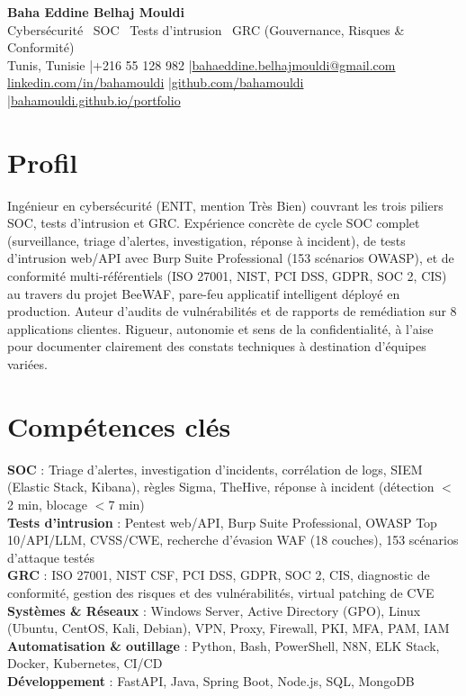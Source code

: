 \documentclass[a4paper,9pt]{article}
\begin{document}
\begin{center}
{\LARGE\bfseries\color{navy} Baha Eddine Belhaj Mouldi}\\[2pt]
{\normalsize\color{navy} Cybersécurité \textbar\ SOC \textbar\ Tests d'intrusion \textbar\ GRC (Gouvernance, Risques \& Conformité)}\\[3pt]
{\small Tunis, Tunisie \quad|\quad +216 55 128 982 \quad|\quad \href{mailto:bahaeddine.belhajmouldi@gmail.com}{bahaeddine.belhajmouldi@gmail.com}}\\[1pt]
{\small \href{https://www.linkedin.com/in/bahamouldi}{linkedin.com/in/bahamouldi} \quad|\quad \href{https://github.com/bahamouldi}{github.com/bahamouldi} \quad|\quad \href{https://bahamouldi.github.io/portfolio/}{bahamouldi.github.io/portfolio}}
\end{center}
\vspace{1pt}
\section{Profil}
Ingénieur en cybersécurité (ENIT, mention Très Bien) couvrant les trois piliers SOC, tests d'intrusion et GRC. Expérience concrète de cycle SOC complet (surveillance, triage d'alertes, investigation, réponse à incident), de tests d'intrusion web/API avec Burp Suite Professional (153 scénarios OWASP), et de conformité multi-référentiels (ISO 27001, NIST, PCI DSS, GDPR, SOC 2, CIS) au travers du projet BeeWAF, pare-feu applicatif intelligent déployé en production. Auteur d'audits de vulnérabilités et de rapports de remédiation sur 8 applications clientes. Rigueur, autonomie et sens de la confidentialité, à l'aise pour documenter clairement des constats techniques à destination d'équipes variées.
\section{Compétences clés}
\textbf{SOC} : Triage d'alertes, investigation d'incidents, corrélation de logs, SIEM (Elastic Stack, Kibana), règles Sigma, TheHive, réponse à incident (détection $<$2 min, blocage $<$7 min)\\[0.3pt]
\textbf{Tests d'intrusion} : Pentest web/API, Burp Suite Professional, OWASP Top 10/API/LLM, CVSS/CWE, recherche d'évasion WAF (18 couches), 153 scénarios d'attaque testés\\[0.3pt]
\textbf{GRC} : ISO 27001, NIST CSF, PCI DSS, GDPR, SOC 2, CIS, diagnostic de conformité, gestion des risques et des vulnérabilités, virtual patching de CVE\\[0.3pt]
\textbf{Systèmes \& Réseaux} : Windows Server, Active Directory (GPO), Linux (Ubuntu, CentOS, Kali, Debian), VPN, Proxy, Firewall, PKI, MFA, PAM, IAM\\[0.3pt]
\textbf{Automatisation \& outillage} : Python, Bash, PowerShell, N8N, ELK Stack, Docker, Kubernetes, CI/CD\\[0.3pt]
\textbf{Développement} : FastAPI, Java, Spring Boot, Node.js, SQL, MongoDB
\end{document}

